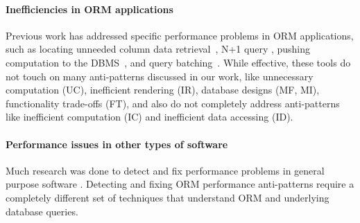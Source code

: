 \paragraph{\bf{Inefficiencies in ORM applications}}
Previous work has addressed specific performance problems in ORM applications, such as locating unneeded column data retrieval~\cite{chen:se16:redundantData}, N+1 query
\cite{chen:se14:antipattern}, pushing computation to the DBMS~\cite{cheung:pldi13}, and query batching~\cite{cheung:sigmod14:sloth, dbridge:tkde15, quro}. While effective, these tools do not touch on many anti-patterns discussed in our work, like unnecessary computation (UC), inefficient rendering (IR), database designs (MF, MI), functionality trade-offs (FT), and also do not completely address anti-patterns like inefficient computation (IC) and inefficient data accessing (ID). 


\vspace{-0.08in}
\paragraph{\bf{Performance issues in other types of software}}
Much research was done to detect and fix performance
problems in general purpose software
\cite{song.pldi12,toddler.icse13,caramel.icse15,isil.pldi15,bloat.fse08,harry.pldi09,harry.pldi10}.
Detecting and fixing ORM performance anti-patterns require a completely different set of techniques that understand ORM and underlying database queries.
